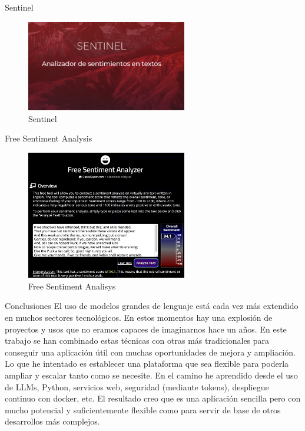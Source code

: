 \documentclass[aspectratio=169,xcolor=dvipsnames, t]{beamer}
\begin{document}
\begin{frame}{Sentinel}
    \begin{figure}
        \includegraphics[width=7cm]{style_data/img/sentinel.png}   
        \caption{Sentinel}     
    \end{figure}
\end{frame}

\begin{frame}{Free Sentiment Analysis}
    \begin{figure}
        \includegraphics[width=7cm]{style_data/img/free_sentiment_analysis.png}        
        \caption{Free Sentiment Analisys}
    \end{figure}
\end{frame}



\begin{frame}{Conclusiones}
    El uso de modelos grandes de lenguaje está cada vez más extendido en muchos sectores tecnológicos.
En estos momentos hay una explosión de proyectos y usos que no eramos capaces de imaginarnos hace un años.
En este trabajo se han combinado estas técnicas con otras más tradicionales para conseguir una aplicación 
útil con muchas oportunidades de mejora y ampliación.
Lo que he intentado es establecer una plataforma que sea flexible para poderla ampliar y escalar tanto como se necesite.
En el camino he aprendido desde el uso de LLMs, Python, servicios web, seguridad (mediante tokens), 
despliegue continuo con docker, etc. El resultado creo que es una aplicación sencilla pero 
con mucho potencial y suficientemente flexible como para servir de base de otros desarrollos más complejos.
\end{frame}
\end{document}
